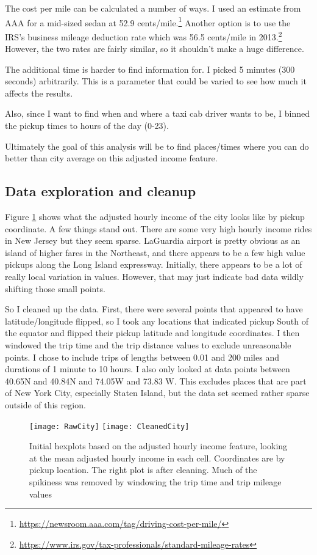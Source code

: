 \documentclass[10pt]{article} %
\begin{document}
The cost per mile can be calculated a number of ways. I used an estimate from AAA for a mid-sized sedan at 52.9 cents/mile.\footnote{\url{https://newsroom.aaa.com/tag/driving-cost-per-mile/}}
Another option is to use the IRS's business mileage deduction rate which was 56.5 cents/mile in 2013.\footnote{\url{https://www.irs.gov/tax-professionals/standard-mileage-rates}} However, the two rates are fairly similar, so it shouldn't make a huge difference.


The additional time is harder to find information for. I picked 5 minutes (300 seconds) arbitrarily. This is a parameter that could be varied to see how much it affects the results.

Also, since I want to find when and where a taxi cab driver wants to be, I binned the pickup times to hours of the day (0-23).

Ultimately the goal of this analysis will be to find places/times where you can do better than city average on this adjusted income feature.
\newpage
\subsection*{Data exploration and cleanup}
Figure \ref{explore} shows what the adjusted hourly income of the city looks like by pickup coordinate. A few things stand out. There are some very high hourly income rides in New Jersey but they seem sparse. LaGuardia airport is pretty obvious as an island of higher fares in the Northeast, and there appears to be a few high value pickups along the Long Island expressway. Initially, there appears to be a lot of really local variation in values. However, that may just indicate bad data wildly shifting those small points.

So I cleaned up the data. First, there were several points that appeared to have latitude/longitude flipped, so I took any locations that indicated pickup South of the equator and flipped their pickup latitude and longitude coordinates. I then windowed the trip time and the trip distance values to exclude unreasonable points. I chose to include trips of lengths between 0.01 and 200 miles and durations of 1 minute to 10 hours. I also only looked at data points between 40.65N and 40.84N and 74.05W and 73.83 W. This excludes places that are part of New York City, especially Staten Island, but the data set seemed rather sparse outside of this region. 

\begin{figure}[h!]
	\centering
	\texttt{[image: RawCity]}
	\texttt{[image: CleanedCity]}
	\caption{Initial hexplots based on the adjusted hourly income feature, looking at the mean adjusted hourly income in each cell. Coordinates are by pickup location. The right plot is after cleaning. Much of the spikiness was removed by windowing the trip time and trip mileage values}
\label{explore}
\end{figure}
\end{document}
